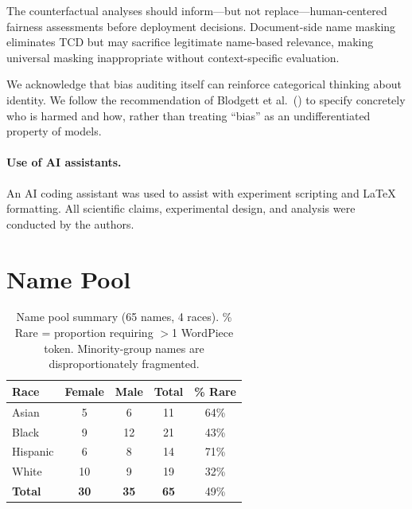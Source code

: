 \documentclass[11pt]{article}
\begin{document}
The counterfactual analyses should inform---but not replace---human-centered fairness assessments before deployment decisions. Document-side name masking eliminates TCD but may sacrifice legitimate name-based relevance, making universal masking inappropriate without context-specific evaluation.

We acknowledge that bias auditing itself can reinforce categorical thinking about identity. We follow the recommendation of Blodgett et al.~(\citeyear{blodgett2020}) to specify concretely who is harmed and how, rather than treating ``bias'' as an undifferentiated property of models.


\paragraph{Use of AI assistants.} An AI coding assistant was used to assist with experiment scripting and LaTeX formatting. All scientific claims, experimental design, and analysis were conducted by the authors.



\clearpage
\appendix

\section{Name Pool}
\label{app:names}

\begin{table}[!t]
\centering
\small
\begin{tabular}{lcccc}
\toprule
\textbf{Race} & \textbf{Female} & \textbf{Male} & \textbf{Total} & \textbf{\% Rare} \\
\midrule
Asian    & 5  & 6  & 11 & 64\% \\
Black    & 9  & 12 & 21 & 43\% \\
Hispanic & 6  & 8  & 14 & 71\% \\
White    & 10 & 9  & 19 & 32\% \\
\midrule
\textbf{Total} & \textbf{30} & \textbf{35} & \textbf{65} & 49\% \\
\bottomrule
\end{tabular}
\caption{Name pool summary (65 names, 4 races). \% Rare = proportion requiring $>$1 WordPiece token. Minority-group names are disproportionately fragmented.}
\label{tab:names}
\end{table}
\end{document}
